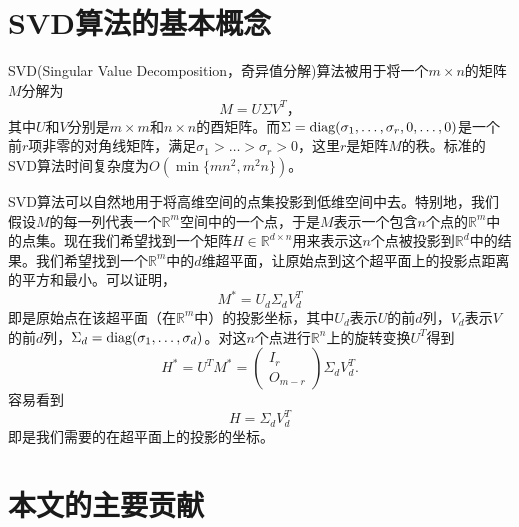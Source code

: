 \section{SVD算法的基本概念}

SVD(Singular Value Decomposition，奇异值分解)算法被用于将一个$m\times n$的矩阵$M$分解为
$$
M=U\Sigma V^T，
$$
其中$U$和$V$分别是$m\times m$和$n\times n$的酉矩阵。而$\Sigma=\textup{diag}(\sigma_1,\dots,\sigma_r,0,\dots,0)$是一个前$r$项非零的对角线矩阵，满足$\sigma_1>\dots>\sigma_r>0$，这里$r$是矩阵$M$的秩。标准的SVD算法时间复杂度为$O(\min\{mn^2,m^2n\})$。

SVD算法可以自然地用于将高维空间的点集投影到低维空间中去。特别地，我们假设$M$的每一列代表一个$\mathbb{R}^m$空间中的一个点，于是$M$表示一个包含$n$个点的$\mathbb{R}^m$中的点集。现在我们希望找到一个矩阵$H\in\mathbb{R}^{d\times n}$用来表示这$n$个点被投影到$\mathbb{R}^{d}$中的结果。我们希望找到一个$\mathbb{R}^m$中的$d$维超平面，让原始点到这个超平面上的投影点距离的平方和最小。可以证明\cite{Stewart92onthe}，
$$
M^*=U_d\Sigma_dV_d^T
$$
即是原始点在该超平面（在$\mathbb{R}^m$中）的投影坐标，其中$U_d$表示$U$的前$d$列，$V_d$表示$V$的前$d$列，$\Sigma_d=\textup{diag}(\sigma_1,\dots,\sigma_d)$。对这$n$个点进行$\mathbb{R}^n$上的旋转变换$U^T$得到
$$
H^*=U^TM^*=\begin{pmatrix}
I_r\\ O_{m-r}
\end{pmatrix}
\Sigma_d V_d^T.
$$
容易看到
\begin{equation}
H=\Sigma_d V_d^T
\end{equation}
即是我们需要的在超平面上的投影的坐标。

\section{本文的主要贡献}